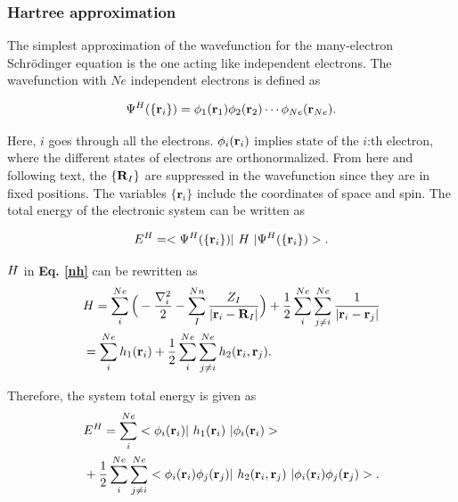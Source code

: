 \documentclass[a4paper, 12pt, titlepage,oneside,drop]{kthesis}
\begin{document}
\subsubsection{Hartree approximation}
\label{ha}
The simplest approximation of the wavefunction for the many-electron Schrödinger equation is the one acting like independent
electrons. The wavefunction with $Ne$ independent electrons is defined as

\begin{equation}\label{wfh}
\wfh = \bwff<1><1> \bwff<2><2> \cdots \bwff<Ne><Ne>. 
\end{equation}

Here, $i$ goes through all the electrons. $\bwff<i><i>$ implies state of the $i$:th electron, where the different states of electrons are orthonormalized. From here and following text, the $\{{\textbf R}_I\}$ are suppressed in the
wavefunction since they are in fixed positions. The variables ${\{\textbf{r}_{{i}}}\}$ include the coordinates of space and spin. The total energy of the electronic system can be written as

\begin{equation}\label{teh}
E^{{H}} = <\Psi^{{H}}(\{ {\textbf r}_{{i}}\}) |\ {{H}} \ | \Psi^{{H}}(\{ {\textbf r}_{{i}}\})  >.
\end{equation}

${{H}}$ in \textbf{Eq. \ref{nh}} can be rewritten as
\begin{equation}\begin{split}
&  {{H}} = \sum\limits_i^{{Ne}} \Big( -\frac{{{\nabla}_{{i}}^{2}}}{2} - \sum\limits_I^{{Nn}} \frac{Z_{I}}{|\textbf{r}_{i}-\textbf{R}_{I}|} \Big) +   \frac{1}{2} \sum\limits_i^{{Ne}} \sum\limits_{j \neq i}^{{Ne}} \frac{1}{ |\textbf{r}_{i}-\textbf{r}_{j}|} \\
& = \sum\limits_i^{{Ne}} h_1(\textbf{r}_{i}) + \frac{1}{2} \sum\limits_i^{{Ne}} \sum\limits_{j \neq i}^{{Ne}} h_2(\textbf{r}_{i},\textbf{r}_{j}).
\end{split}
\end{equation}

Therefore, the system total energy is given as
\begin{equation}\begin{split}\label{bzd}
& E^{H} = \sum\limits_i^{{Ne}} <\bwff<i><i> | \  h_1(\textbf{r}_{i}) \ | \bwff<i><i> > \\
& +\frac{1}{2} \sum\limits_i^{{Ne}} \sum\limits_{j \neq i}^{{Ne}} <\bwff<i><i> \bwff<j><j>|\ h_2(\textbf{r}_{i},\textbf{r}_{j}) \ | \bwff<i><i> \bwff<j><j>>.  
\end{split}\end{equation}
\end{document}
